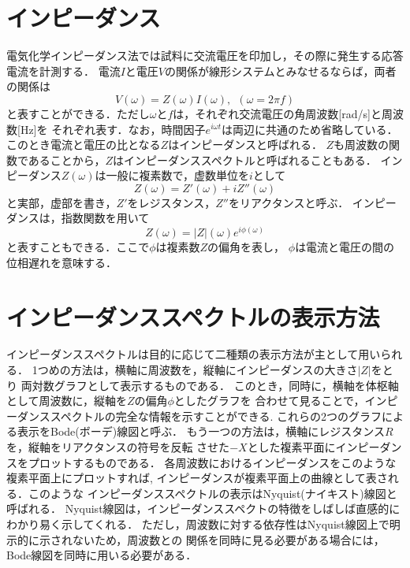\section{インピーダンス}
電気化学インピーダンス法では試料に交流電圧を印加し，その際に発生する応答電流を計測する．
電流$I$と電圧$V$の関係が線形システムとみなせるならば，両者の関係は
\begin{equation}
	V(\omega)= Z(\omega) I(\omega), \ \ (\omega=2\pi f)
	\label{eqn:I2V}
\end{equation}
と表すことができる．ただし$\omega$と$f$は，それぞれ交流電圧の角周波数[rad/s]と周波数[Hz]を
それぞれ表す．なお，時間因子$e^{i\omega t}$は両辺に共通のため省略している．
このとき電流と電圧の比となる$Z$はインピーダンスと呼ばれる．
$Z$も周波数の関数であることから，$Z$はインピーダンススペクトルと呼ばれることもある．
インピーダンス$Z(\omega)$は一般に複素数で，虚数単位を$i$として
\begin{equation}
	Z(\omega)=Z'(\omega)+iZ''(\omega)
	\label{eqn:Z_cmplx}
\end{equation}
と実部，虚部を書き，$Z'$をレジスタンス，$Z''$をリアクタンスと呼ぶ．
インピーダンスは，指数関数を用いて
\begin{equation}
	Z(\omega)=\left| Z \right|(\omega)e ^{i\phi(\omega)}
	\label{eqn:}
\end{equation}
と表すこともできる．ここで$\phi$は複素数$Z$の偏角を表し，
$\phi$は電流と電圧の間の位相遅れを意味する．
%
\section{インピーダンススペクトルの表示方法}
インピーダンススペクトルは目的に応じて二種類の表示方法が主として用いられる．
1つめの方法は，横軸に周波数を，縦軸にインピーダンスの大きさ$|Z|$をとり
両対数グラフとして表示するものである．
このとき，同時に，横軸を体枢軸として周波数に，縦軸を$Z$の偏角$\phi$としたグラフを
合わせて見ることで，インピーダンススペクトルの完全な情報を示すことができる.
これらの2つのグラフによる表示をBode(ボーデ)線図と呼ぶ．
もう一つの方法は，横軸にレジスタンス$R$を，縦軸をリアクタンスの符号を反転
させた$-X$とした複素平面にインピーダンスをプロットするものである．
各周波数におけるインピーダンスをこのような複素平面上にプロットすれば,
インピーダンスが複素平面上の曲線として表される．このような
インピーダンススペクトルの表示はNyquist(ナイキスト)線図と呼ばれる．
Nyquist線図は，インピーダンススペクトの特徴をしばしば直感的にわかり易く示してくれる．
ただし，周波数に対する依存性はNyquist線図上で明示的に示されないため，周波数との
関係を同時に見る必要がある場合には，Bode線図を同時に用いる必要がある．
%
